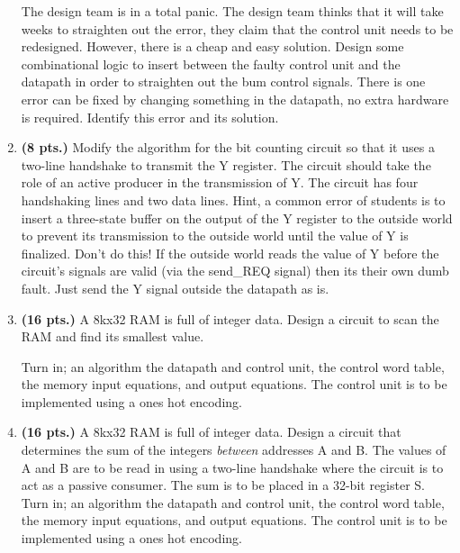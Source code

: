 \begin{enumerate}
        The design team is in a total panic.
        The design team thinks that it will take weeks to straighten out the error,
        they claim that the control unit needs to be redesigned.  However, there is
        a cheap and easy solution.  Design some combinational
        logic to insert between the faulty control unit and the datapath in order
        to straighten out the bum control signals.  There is one error can be
        fixed by changing something in the datapath, no extra hardware is
        required.  Identify this error and its solution.

    \item \textbf{ (8 pts.)}
        Modify the algorithm for the bit counting circuit so that it uses a
        two-line handshake to transmit the Y register.  The circuit should take
        the role of an active producer in the transmission of Y.  The circuit
        has four handshaking lines and two data lines.  Hint, a common
        error of students is to insert a three-state buffer on the output of
        the Y register to the outside world to prevent its transmission to
        the outside world until the value of Y is finalized.  Don't do this!
        If the outside world reads the value of Y before the circuit's signals
        are valid (via the send\_REQ signal) then its their own dumb fault.
        Just send the Y signal outside the datapath as is.

    \item \textbf{ (16 pts.)}
        A 8kx32 RAM is full of integer data.  Design a circuit to scan
        the RAM and find its smallest value.

        Turn in; an algorithm the datapath and control unit, the control word
        table, the memory input equations, and output equations.
        The control unit is to be implemented using a ones hot encoding.

    \item \textbf{ (16 pts.)}
        A 8kx32 RAM is full of integer data.  Design a
        circuit that determines the sum of the integers {\em between} addresses
        A and B.  The values of A and B are to be read in using a two-line
        handshake where the circuit is to act as a passive consumer.
        The sum is to be placed in a 32-bit register S.
        Turn in; an algorithm the datapath and control unit, the control word
        table, the memory input equations, and output equations.
        The control unit is to be implemented using a ones hot encoding.


\end{enumerate}
